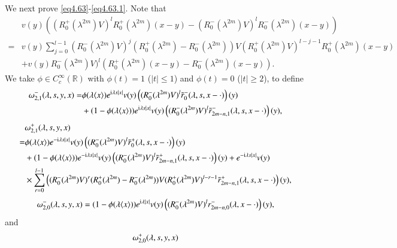 \documentclass[11pt,reqno]{amsart}
\def\i{{\rm i}}
\numberwithin{equation}{section}
\theoremstyle{definition}
\begin{document}
\begin{appendix}
	We next prove \eqref{eq4.63}-\eqref{eq4.63.1}. Note that
	\begin{equation}\label{equ4.65}
		\begin{aligned}
			&v(y)\left((R_{0}^{+}(\lambda^{2m})V)^{l}R_{0}^{+}(\lambda^{2m})(x-y)-(R_{0}^{-}(\lambda^{2m})V)^{l}R_{0}^{-}(\lambda^{2m})(x-y)\right) \\
			=&v(y)\sum_{j=0}^{l-1}(R_{0}^{-}(\lambda^{2m})V)^{j}(R_{0}^{+}(\lambda^{2m})-R_{0}^{-}(\lambda^{2m}))V(R_{0}^{+}(\lambda^{2m})V)^{l-j-1}R_{0}^{+}(\lambda^{2m})(x-y)\\
			&+v(y)R_{0}^{-}(\lambda^{2m})V)^{l}\left(R_{0}^{+}(\lambda^{2m})(x-y)-R_{0}^{-}(\lambda^{2m})(x-y)\right).
		\end{aligned}
	\end{equation}
	We take $ \phi\in C_c^\infty(\mathbb{R})$ with $ \phi(t)=1$ ($|t|\leq1$) and $ \phi(t)=0$ ($|t|\geq2$), to define
		\begin{align*}\small
				\omega_{2,1}^{-}(\lambda,s,y,x)=&\phi(\lambda\langle x\rangle)e^{\i\lambda s|x|}v(y)\left((R_{0}^{-}(\lambda^{2m})V)^{l}
			\tilde{r}^{-}_0(\lambda, s, x-\cdot)\right)(y)\\
			&+(1-\phi(\lambda\langle x\rangle))e^{\i\lambda s|x|}v(y)\left((R_{0}^{-}(\lambda^{2m})V)^{l}\tilde{r}^{-}_{2m-n, 1}(\lambda, s, x-\cdot)\right)(y),
		\end{align*}
		\begin{align*}\scriptsize
			&\omega_{2,1}^{+}(\lambda,s,y,x)\\
			=&\phi(\lambda\langle x\rangle)e^{-\i\lambda s|x|}v(y)\left((R_{0}^{-}(\lambda^{2m})V)^{l} \tilde{r}^{+}_0(\lambda, s, x-\cdot)\right)(y)\\
			&+(1-\phi(\lambda\langle x\rangle))e^{-\i\lambda s|x|}v(y)\left((R_{0}^{-}(\lambda^{2m})V)^{l}\tilde{r}^{+}_{2m-n, 1}(\lambda, s, x-\cdot)\right)(y)+e^{-\i\lambda s|x|}v(y)\\
			&\times\sum_{r=0}^{l-1}\left((R_{0}^{-}(\lambda^{2m})V)^{r}(R_{0}^{+}(\lambda^{2m})-R_{0}^{-}(\lambda^{2m}))V
			(R_{0}^{+}(\lambda^{2m})V)^{l-r-1}\tilde{r}^{+}_{2m-n, 1}(\lambda, s, x-\cdot)\right)(y),
		\end{align*}
		\begin{align*}\small
			\omega_{2,0}^{-}(\lambda,s,y,x)=(1-\phi(\lambda\langle x\rangle))e^{\i\lambda |x|}v(y)\left((R_{0}^{-}(\lambda^{2m})V)^{l}
			r^{-}_{2m-n, 0}(\lambda, x-\cdot)\right)(y),
		\end{align*}
		and
		\begin{align*}\scriptsize
			&\omega_{2,0}^{+}(\lambda,s,y,x)\\

\end{align*}
\end{appendix}
\end{document}
